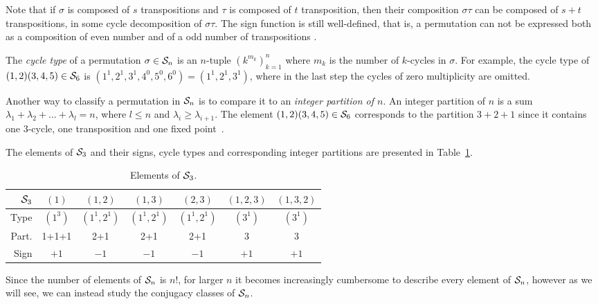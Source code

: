 Note that if $\sigma$ is composed of $s$ transpositions and $\tau$ is composed of $t$ transposition, then their composition $\sigma\tau$ can be composed of $s+t$ transpositions, in some cycle decomposition of $\sigma\tau$. The sign function is still well-defined, that is, a permutation can not be expressed both as a composition of even number and of a odd number of transpositions \cite[Thm.12.6.1.]{Biggs}.

The \textit{cycle type} of a permutation $\sigma \in \mathcal{S}_n$ is an $n$-tuple $(k^{m_k})_{k=1}^n$ where $m_k$ is the number of $k$-cycles in $\sigma$. For example, the cycle type of $(1,2)(3,4,5) \in \mathcal{S}_6$ is $(1^1, 2^1, 3^1, 4^0, 5^0, 6^0) = (1^1, 2^1, 3^1)$, where in the last step the cycles of zero multiplicity are omitted.

Another way to classify a permutation in $\mathcal{S}_n$ is to compare it to an \textit{integer partition of $n$}. An integer partition of $n$ is a sum $\lambda_1+ \lambda_2+ \dots+ \lambda_l = n$, where $l \leq n$ and $\lambda_i \geq \lambda_{i+1}$. The element $(1,2)(3,4,5) \in \mathcal{S}_6$ corresponds to the partition $3+2+1$ since it contains one 3-cycle, one transposition and one fixed point~\cite[Sect.1.1.]{Sagan}.  

\begin{example}[$\Sym_3$]
	The elements of $\Sym_3$ and their signs,  cycle types and corresponding integer partitions are presented in Table~\ref{table:elementsSym3}.
\end{example}

\begin{table}[hbt!]
	\centering
	\begin{tabular}{r | c c c c c c }
		$\Sym_3$ & $(1)$   & $(1,2)$     & $(1,3)$     & $(2,3)$     & $(1,2,3)$ & $(1,3,2)$ \\ \hline
		    Type & $(1^3)$ & $(1^1,2^1)$ & $(1^1,2^1)$ & $(1^1,2^1)$ & $(3^1)$   & $(3^1)$   \\
		   Part. & 1+1+1   & 2+1         & 2+1         & 2+1         & 3         & 3         \\
		   Sign  & $+1$    & $-1$        & $-1$        & $-1$        & $+1$      & $+1$
	\end{tabular}
	\caption{Elements of $\Sym_3$.}
	\label{table:elementsSym3}
\end{table}

Since the number of elements of $\mathcal{S}_n$ is $n!$, for larger $n$ it becomes increasingly cumbersome to describe every element of $\mathcal{S}_n$, however as we will see, we can instead study the conjugacy classes of $\mathcal{S}_n$.

